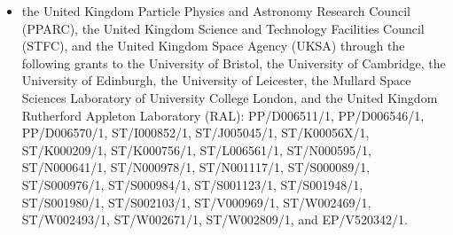 \documentclass[longauth]{aa}
\begin{document}
\begin{appendix}
\begin{itemize}
\item the United Kingdom Particle Physics and Astronomy Research Council (PPARC), the United Kingdom Science and Technology Facilities Council (STFC), and the United Kingdom Space Agency (UKSA) through the following grants to the University of Bristol, the University of Cambridge, the University of Edinburgh, the University of Leicester, the Mullard Space Sciences Laboratory of University College London, and the United Kingdom Rutherford Appleton Laboratory (RAL): PP/D006511/1, PP/D006546/1, PP/D006570/1, ST/I000852/1, ST/J005045/1, ST/K00056X/1, ST/\-K000209/1, ST/K000756/1, ST/L006561/1, ST/N000595/1, ST/N000641/1, ST/N000978/1, ST/\-N001117/1, ST/S000089/1, ST/S000976/1, ST/S000984/1, ST/S001123/1, ST/S001948/1, ST/\-S001980/1, ST/S002103/1, ST/V000969/1, ST/W002469/1, ST/W002493/1, ST/W002671/1, ST/W002809/1, and EP/V520342/1.
\end{itemize}


\end{appendix}
\end{document}
